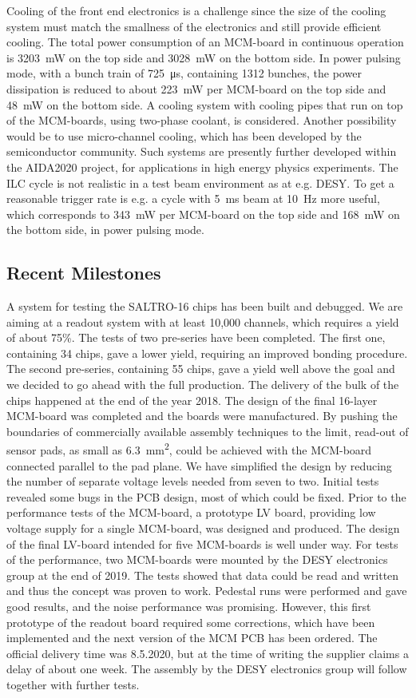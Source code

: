 Cooling of the front end electronics is a challenge since the size of the cooling system must match the smallness of the electronics and still provide efficient cooling. The total power consumption of an MCM-board in continuous operation
is \SI{3203}{mW} on the top side and \SI{3028}{mW} on the bottom side. In power pulsing mode, with a bunch train of \SI{725}{\micro s}, containing 1312 bunches, the power dissipation is reduced to about \SI{223}{mW} per MCM-board on the top side and \SI{48}{mW} on the bottom side. A cooling system with cooling pipes that run on top of the MCM-boards, using two-phase  coolant, is considered. Another possibility would be to use micro-channel cooling, which has been developed by the semiconductor community. Such systems are presently further developed within the AIDA2020 project, for applications in high energy physics experiments. The ILC cycle is not realistic in a test beam environment as at e.g. DESY. To get a reasonable trigger rate is e.g. a cycle with \SI{5}{ms} beam at \SI{10}{Hz} more useful, which corresponds to \SI{343}{mW} per MCM-board on the top side and \SI{168}{mW} on the bottom side, in power pulsing mode.

\subsection{Recent Milestones}
A system for testing the SALTRO-16 chips has been built and debugged. We are aiming at a readout system with at least 10,000 channels, which requires a yield of about 75\%. The tests of two pre-series have been completed. The first one, containing 34 chips, gave a lower yield, requiring an improved bonding procedure. The second pre-series, containing 55 chips, gave a yield well above the goal and we decided to go ahead with the full production.
The delivery of the bulk of the chips happened at the end of the year 2018.
The design of the final 16-layer MCM-board was completed and the boards were manufactured. By pushing the boundaries of commercially available assembly techniques to the limit, read-out of sensor pads, as small as \SI{6.3}{mm^2}, could be achieved with the MCM-board connected parallel to the pad plane. We have simplified the design by reducing the number of separate voltage levels needed from seven to two. Initial tests revealed some bugs in the PCB design, most of which could be fixed. Prior to the performance tests of the MCM-board, a prototype LV board, providing low voltage supply for a single MCM-board, was designed and produced. The design of the final LV-board intended for five MCM-boards is well under way.
For tests of the performance, two MCM-boards were mounted by the DESY electronics group at the end of 2019. The tests showed that data could be read and written and thus the concept was proven to work. Pedestal runs were performed and gave good results, and the noise performance was promising. However, this first prototype of the readout board required some corrections, which have been implemented and the next version of the MCM PCB has been ordered. The official delivery time was 8.5.2020, but at the time of writing the supplier claims a delay of about one week. The assembly by the DESY electronics group will follow together with further tests.

